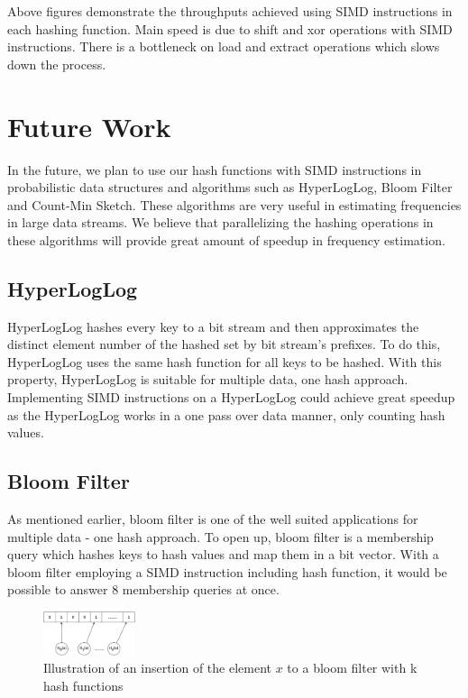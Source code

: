 \documentclass[a0,portrait]{a0poster}
\begin{document}
\begin{minipage}[c]{\linewidth}
\begin{framed}
\begin{multicols}{2}
\begin{figure}[H]
        \hspace{1em}

    
    \label{fig:my_label}
\end{figure}
Above figures demonstrate the throughputs achieved using SIMD instructions in each hashing function. Main speed is due to shift and xor operations with SIMD instructions. There is a bottleneck on load and extract operations which slows down the process.
\section{Future Work}
In the future, we plan to use our hash functions with SIMD instructions in probabilistic data structures and algorithms such as HyperLogLog, Bloom Filter and Count-Min Sketch. These algorithms are very useful in estimating frequencies in large data streams.  We believe that parallelizing the hashing operations in these algorithms  will provide great amount of speedup in frequency estimation. 
\subsection{HyperLogLog}
HyperLogLog hashes every key to a bit stream and then approximates the distinct element number of the hashed set by bit stream's prefixes. To do this, HyperLogLog uses the same hash function for all keys to be hashed. With this property, HyperLogLog is suitable for multiple data, one hash approach. 
Implementing SIMD instructions on a HyperLogLog could achieve great speedup as the HyperLogLog works in a one pass over data manner, only counting hash values.
\subsection{Bloom Filter}
As mentioned earlier, bloom filter is one of the well suited applications for multiple data - one hash approach. To open up, bloom filter is a membership query which hashes keys to hash values and map them in a bit vector. With a bloom filter employing a SIMD instruction including hash function, it would be possible to answer 8 membership queries at once.
\begin{figure}[H]
\centering
\includegraphics[width=0.24\textwidth]{bloom.eps}
\caption{Illustration of an insertion of the element $x$ to a bloom filter with k hash functions}
\end{figure}

\end{multicols}
\end{framed}
\end{minipage}
\end{document}
